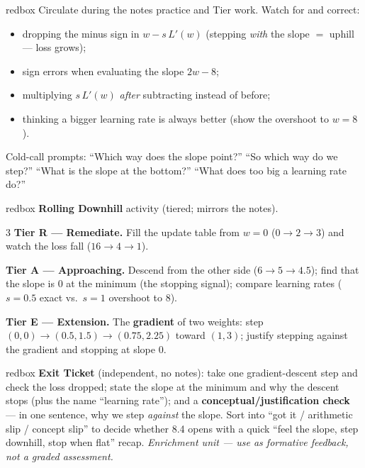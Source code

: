 \documentclass[10pt]{article}
\begin{document}
\begin{skillbox}{redbox}
Circulate during the notes practice and Tier work. Watch for and correct:
\begin{itemize}[leftmargin=1.2em, nosep]
  \item dropping the minus sign in $w-s\,L'(w)$ (stepping \emph{with} the slope $=$ uphill --- loss grows);
  \item sign errors when evaluating the slope $2w-8$;
  \item multiplying $s\,L'(w)$ \emph{after} subtracting instead of before;
  \item thinking a bigger learning rate is always better (show the overshoot to $w=8$).
\end{itemize}
Cold-call prompts: ``Which way does the slope point?'' ``So which way do we step?'' ``What is the slope at the
bottom?'' ``What does too big a learning rate do?''
\end{skillbox}

\begin{skillbox}{redbox}
\textbf{Rolling Downhill} activity (tiered; mirrors the notes).
\begin{multicols}{3}
\textbf{Tier R --- Remediate.} Fill the update table from $w=0$ ($0\to2\to3$) and watch the loss fall
($16\to4\to1$).

\columnbreak
\textbf{Tier A --- Approaching.} Descend from the other side ($6\to5\to4.5$); find that the slope is $0$ at the
minimum (the stopping signal); compare learning rates ($s=0.5$ exact vs.\ $s=1$ overshoot to $8$).

\columnbreak
\textbf{Tier E --- Extension.} The \textbf{gradient} of two weights: step $(0,0)\to(0.5,1.5)\to(0.75,2.25)$
toward $(1,3)$; justify stepping against the gradient and stopping at slope $0$.
\end{multicols}
\end{skillbox}

\begin{skillbox}{redbox}
\textbf{Exit Ticket} (independent, no notes): take one gradient-descent step and check the loss dropped; state
the slope at the minimum and why the descent stops (plus the name ``learning rate''); and a
\textbf{conceptual/justification check} --- in one sentence, why we step \emph{against} the slope. Sort into
``got it / arithmetic slip / concept slip'' to decide whether 8.4 opens with a quick ``feel the slope, step
downhill, stop when flat'' recap. \emph{Enrichment unit --- use as formative feedback, not a graded
assessment.}
\end{skillbox}
\end{document}
